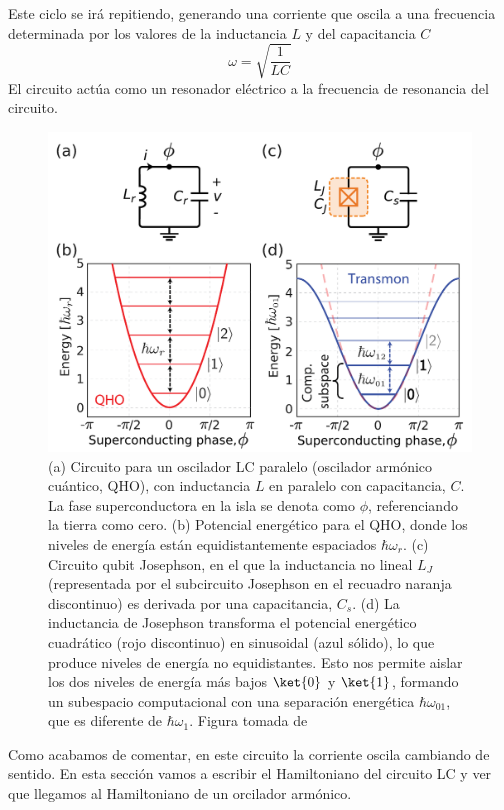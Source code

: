         Este ciclo se irá repitiendo, generando una corriente que oscila a una frecuencia determinada por los valores de la inductancia $L$ y del capacitancia $C$ 
        \begin{equation} \label{ec_sqc_LCC_omega}
            \omega = \sqrt{\frac{1}{LC}}
        \end{equation}
        El circuito actúa como un resonador eléctrico a la frecuencia de resonancia del circuito.

        
        

        \begin{figure}[t]
            \centering 
            \includegraphics[width=0.6\linewidth]{Figuras/Fig_sqc_circuitos_LC.png}
            \caption{(a) Circuito para un oscilador LC paralelo (oscilador armónico cuántico, QHO), con inductancia $L$ en paralelo con capacitancia, $C$. La fase superconductora en la isla se denota como $\phi$, referenciando la tierra como cero. (b) Potencial energético para el QHO, donde los niveles de energía están equidistantemente espaciados $\hbar \omega_r$. (c) Circuito qubit Josephson, en el que la inductancia no lineal $L_J$ (representada por el subcircuito Josephson en el recuadro naranja discontinuo) es derivada por una capacitancia, $C_s$. (d) La inductancia de Josephson transforma el potencial energético cuadrático (rojo discontinuo) en sinusoidal (azul sólido), lo que produce niveles de energía no equidistantes. Esto nos permite aislar los dos niveles de energía más bajos $\ket{0}$ y $\ket{1}$, formando un subespacio computacional con una separación energética $\hbar \omega_{01}$, que es diferente de $\hbar \omega_{1}$. Figura tomada de \cite{bib_A_quantum_engineers_guide}}
            \label{Fig_sqc_circuitos_LC}
        \end{figure}



        Como acabamos de comentar, en este circuito la corriente oscila cambiando de sentido. En esta sección vamos a escribir el Hamiltoniano del circuito LC y ver que llegamos al Hamiltoniano de un orcilador armónico. 
       
